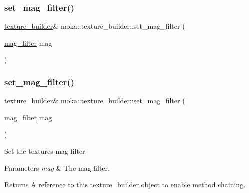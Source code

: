 \subsubsection{\texorpdfstring{set\_mag\_filter()}{set\_mag\_filter()}\hspace{0.1cm}{\footnotesize\ttfamily [1/2]}}
{\footnotesize\ttfamily \mbox{\hyperlink{classmoka_1_1texture__builder}{texture\+\_\+builder}}\& moka\+::texture\+\_\+builder\+::set\+\_\+mag\+\_\+filter (\begin{DoxyParamCaption}\item[{\mbox{\hyperlink{namespacemoka_a2391e4ae99494b70d0226ee0e586f33c}{mag\+\_\+filter}}}]{mag }\end{DoxyParamCaption})}

\mbox{\label{classmoka_1_1texture__builder_a08398bb398d3b35e1ecd7a669b3fd792}} 
\subsubsection{\texorpdfstring{set\_mag\_filter()}{set\_mag\_filter()}\hspace{0.1cm}{\footnotesize\ttfamily [2/2]}}
{\footnotesize\ttfamily \mbox{\hyperlink{classmoka_1_1texture__builder}{texture\+\_\+builder}}\& moka\+::texture\+\_\+builder\+::set\+\_\+mag\+\_\+filter (\begin{DoxyParamCaption}\item[{\mbox{\hyperlink{namespacemoka_a2391e4ae99494b70d0226ee0e586f33c}{mag\+\_\+filter}}}]{mag }\end{DoxyParamCaption})}



Set the texture\textquotesingle{}s mag filter. 


\begin{DoxyParams}{Parameters}
{\em mag} & The mag filter. \\
\hline
\end{DoxyParams}
\begin{DoxyReturn}{Returns}
A reference to this \mbox{\hyperlink{classmoka_1_1texture__builder}{texture\+\_\+builder}} object to enable method chaining. 
\end{DoxyReturn}
\mbox{\label{classmoka_1_1texture__builder_a308c57f97f3d9477f0b15e31ef37cf4c}} 
